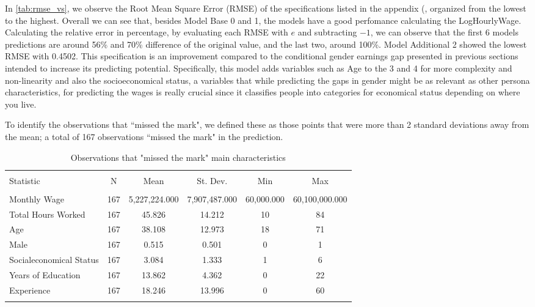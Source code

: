 \documentclass[12pt,a4paper,onecolumn]{article}
\begin{document}
In \autoref{tab:rmse_vs}, we observe the Root Mean Square Error (RMSE) of the specifications listed in the appendix (, organized from the lowest to the highest. Overall we can see that, besides Model Base 0 and 1, the models have a good perfomance calculating the LogHourlyWage. Calculating the relative error in percentage, by evaluating each RMSE with $e$ and subtracting $-1$, we can observe that the first 6 models predictions are around 56\% and 70\% difference of the original value, and the last two, around 100\%.
Model Additional 2 showed the lowest RMSE with 0.4502. This specification is an improvement compared to the conditional gender earnings gap presented in  previous sections intended to increase its predicting potential. Specifically, this model adds variables such as Age to the 3 and 4 for more complexity and non-linearity and also the socioeconomical status, a variables that while predicting the gaps in gender might be as relevant as other persona characteristics, for predicting the wages is really crucial since it classifies people into categories for economical status depending on where you live. 

To identify the observations that ``missed the mark", we defined these as those points that were more than 2 standard deviations away from the mean; a total of 167 observations ``missed the mark" in the prediction.

\begin{table}[!htbp] \centering \scriptsize
  \caption{Observations that "missed the mark" main characteristics} 
  \label{tab:missedthemark} 
\begin{tabular}{@{\extracolsep{5pt}}lccccc} 
\\[-1.8ex]\hline 
\hline \\[-1.8ex] 
Statistic & \multicolumn{1}{c}{N} & \multicolumn{1}{c}{Mean} & \multicolumn{1}{c}{St. Dev.} & \multicolumn{1}{c}{Min} & \multicolumn{1}{c}{Max} \\ 
\hline \\[-1.8ex] 
Monthly Wage& 167 & 5,227,224.000 & 7,907,487.000 & 60,000.000 & 60,100,000.000 \\ 
Total Hours Worked & 167 & 45.826 & 14.212 & 10 & 84 \\ 
Age & 167 & 38.108 & 12.973 & 18 & 71 \\ 
Male & 167 & 0.515 & 0.501 & 0 & 1 \\ 
Socialeconomical Status & 167 & 3.084 & 1.333 & 1 & 6 \\ 
Years of Education & 167 & 13.862 & 4.362 & 0 & 22 \\ 
Experience & 167 & 18.246 & 13.996 & 0 & 60 \\ 
\hline \\[-1.8ex] 
\end{tabular} 
\end{table} 
\end{document}
